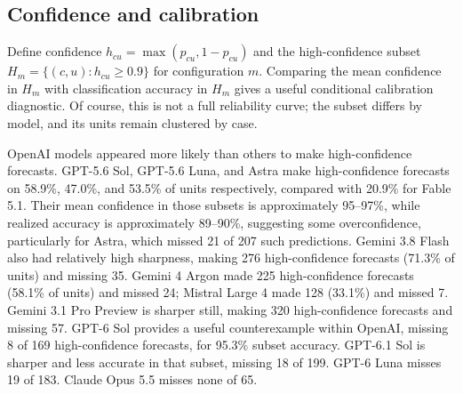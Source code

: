 \documentclass[11pt]{article}
\begin{document}
\subsection{Confidence and calibration}
Define confidence $h_{cu}=\max(p_{cu},1-p_{cu})$ and the high-confidence subset $H_m=\{(c,u):h_{cu}\geq0.9\}$ for configuration $m$. Comparing the mean confidence in $H_m$ with classification accuracy in $H_m$ gives a useful conditional calibration diagnostic. Of course, this is not a full reliability curve; the subset differs by model, and its units remain clustered by case.

OpenAI models appeared more likely than others to make high-confidence forecasts. GPT-5.6 Sol, GPT-5.6 Luna, and Astra make high-confidence forecasts on 58.9\%, 47.0\%, and 53.5\% of units respectively, compared with 20.9\% for Fable 5.1. Their mean confidence in those subsets is approximately 95--97\%, while realized accuracy is approximately 89--90\%, suggesting some overconfidence, particularly for Astra, which missed 21 of 207 such predictions. Gemini 3.8 Flash also had relatively high sharpness, making 276 high-confidence forecasts (71.3\% of units) and missing 35. Gemini 4 Argon made 225 high-confidence forecasts (58.1\% of units) and missed 24; Mistral Large 4 made 128 (33.1\%) and missed 7. Gemini 3.1 Pro Preview is sharper still, making 320 high-confidence forecasts and missing 57. GPT-6 Sol provides a useful counterexample within OpenAI, missing 8 of 169 high-confidence forecasts, for 95.3\% subset accuracy. GPT-6.1 Sol is sharper and less accurate in that subset, missing 18 of 199. GPT-6 Luna misses 19 of 183. Claude Opus 5.5 misses none of 65.
\end{document}
